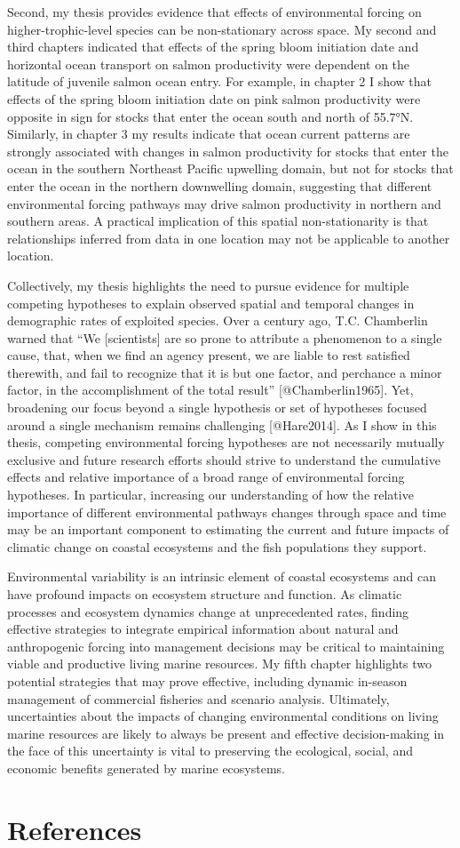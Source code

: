 Second, my thesis provides evidence that effects of environmental
forcing on higher-trophic-level species can be non-stationary across
space. My second and third chapters indicated that effects of the spring
bloom initiation date and horizontal ocean transport on salmon
productivity were dependent on the latitude of juvenile salmon ocean
entry. For example, in chapter 2 I show that effects of the spring bloom
initiation date on pink salmon productivity were opposite in sign for
stocks that enter the ocean south and north of 55.7°N. Similarly, in
chapter 3 my results indicate that ocean current patterns are strongly
associated with changes in salmon productivity for stocks that enter the
ocean in the southern Northeast Pacific upwelling domain, but not for
stocks that enter the ocean in the northern downwelling domain,
suggesting that different environmental forcing pathways may drive
salmon productivity in northern and southern areas. A practical
implication of this spatial non-stationarity is that relationships
inferred from data in one location may not be applicable to another
location.

Collectively, my thesis highlights the need to pursue evidence for
multiple competing hypotheses to explain observed spatial and temporal
changes in demographic rates of exploited species. Over a century ago,
T.C. Chamberlin warned that ``We {[}scientists{]} are so prone to
attribute a phenomenon to a single cause, that, when we find an agency
present, we are liable to rest satisfied therewith, and fail to
recognize that it is but one factor, and perchance a minor factor, in
the accomplishment of the total result'' {[}@Chamberlin1965{]}. Yet,
broadening our focus beyond a single hypothesis or set of hypotheses
focused around a single mechanism remains challenging {[}@Hare2014{]}.
As I show in this thesis, competing environmental forcing hypotheses are
not necessarily mutually exclusive and future research efforts should
strive to understand the cumulative effects and relative importance of a
broad range of environmental forcing hypotheses. In particular,
increasing our understanding of how the relative importance of different
environmental pathways changes through space and time may be an
important component to estimating the current and future impacts of
climatic change on coastal ecosystems and the fish populations they
support.

Environmental variability is an intrinsic element of coastal ecosystems
and can have profound impacts on ecosystem structure and function. As
climatic processes and ecosystem dynamics change at unprecedented rates,
finding effective strategies to integrate empirical information about
natural and anthropogenic forcing into management decisions may be
critical to maintaining viable and productive living marine resources.
My fifth chapter highlights two potential strategies that may prove
effective, including dynamic in-season management of commercial
fisheries and scenario analysis. Ultimately, uncertainties about the
impacts of changing environmental conditions on living marine resources
are likely to always be present and effective decision-making in the
face of this uncertainty is vital to preserving the ecological, social,
and economic benefits generated by marine ecosystems.

\chapter{References}\label{references}

